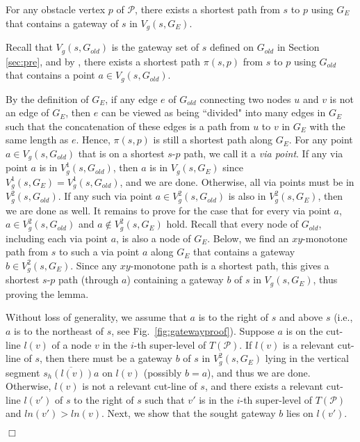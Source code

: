 \documentclass[english,runningheads,11pt]{llncs}
\def\calP{\mathcal{P}}
\newenvironment{proof}{\noindent {\textbf{Proof:}}\rm}{\hfill $\Box$\rm}
\begin{document}
\begin{lemma}\label{lem:20}
For any obstacle vertex $p$ of $\calP$, there exists a shortest path
from $s$ to $p$ using $G_E$ that contains a gateway of $s$ in $V_g(s,G_E)$.
\end{lemma}
\begin{proof}
Recall that $V_g(s,G_{old})$ is the gateway set of $s$ defined on
$G_{old}$ in Section \ref{sec:pre}, and by \cite{ref:ChenSh00}, there exists a
shortest path $\pi(s,p)$ from $s$ to $p$ using $G_{old}$
that contains a point $a\in V_g(s,G_{old})$.

By the definition of $G_E$, if any edge $e$ of $G_{old}$ connecting two nodes $u$ and $v$ is not an edge of $G_E$, then $e$
can be viewed as being ``divided" into many edges in $G_E$ such that the concatenation
of these edges is a path from $u$ to $v$ in $G_E$ with the same length
as $e$. Hence, $\pi(s,p)$ is still a shortest path
along $G_E$.
For any point $a \in V_g(s,G_{old})$ that is on a shortest $s$-$p$ path, we call
it a {\it via point}.
If any via point $a$ is in $V^1_g(s,G_{old})$, then $a$ is in $V_g(s,G_E)$
since $V^1_g(s,G_E)=V^1_g(s,G_{old})$, and we are done.
Otherwise, all via points must be in $V^2_g(s,G_{old})$. If any such via point $a\in V^2_g(s,G_{old})$ is also in
$V^2_g(s,G_E)$, then we are done as well. It remains to prove for the
case that for every via point $a$, $a\in V^2_g(s,G_{old})$ and $a\not\in
V^2_g(s,G_E)$ hold. Recall that every node of $G_{old}$, including each via point
$a$, is also a node of $G_E$.
Below, we find an $xy$-monotone path from $s$ to such a via point $a$ along $G_E$ that
contains a gateway $b \in V^2_g(s,G_E)$. Since any $xy$-monotone path
is a shortest path, this gives a shortest $s$-$p$ path (through $a$)
containing a gateway $b$ of $s$ in $V_g(s,G_E)$, thus proving the lemma.

Without loss of generality, we assume that $a$ is to the right of $s$ and
above $s$ (i.e., $a$ is to the northeast of $s$, see
Fig.~\ref{fig:gatewayproof}). Suppose $a$ is on the cut-line $l(v)$ of a node $v$ in
the $i$-th super-level of $T(\calP)$.
If $l(v)$ is a relevant cut-line of $s$, then there must be a gateway $b$ of $s$ in $V^2_g(s,G_E)$
lying in the vertical segment $\overline{s_h(l(v))a}$ on $l(v)$ (possibly $b=a$), and thus
we are done.  Otherwise, $l(v)$ is not a relevant cut-line of $s$, and
there exists a relevant cut-line $l(v')$ of $s$
to the right of $s$ such that $v'$ is in the $i$-th super-level of $T(\calP)$
and $ln(v')>ln(v)$.
Next, we show that the sought gateway $b$ lies on $l(v')$.


\end{proof}
\end{document}
